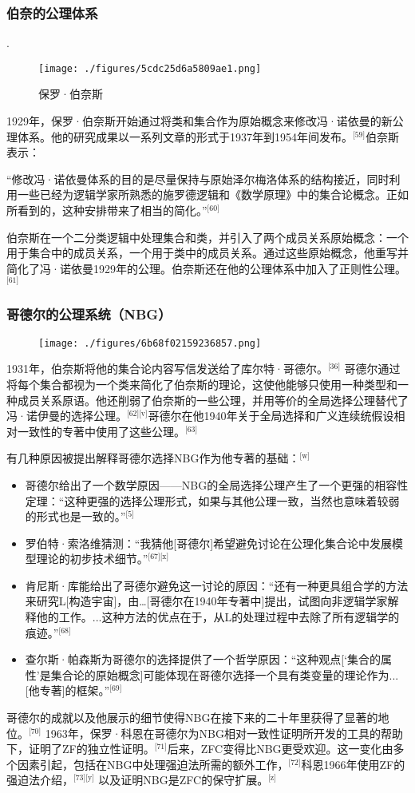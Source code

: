 \subsubsection{伯奈的公理体系}
.\begin{figure}[ht]
\centering
\texttt{[image: ./figures/5cdc25d6a5809ae1.png]}
\caption{保罗·伯奈斯} \label{fig_NBG_3}
\end{figure}
1929年，保罗·伯奈斯开始通过将类和集合作为原始概念来修改冯·诺依曼的新公理体系。他的研究成果以一系列文章的形式于1937年到1954年间发布。\(^\text{[59]}\)伯奈斯表示：

“修改冯·诺依曼体系的目的是尽量保持与原始泽尔梅洛体系的结构接近，同时利用一些已经为逻辑学家所熟悉的施罗德逻辑和《数学原理》中的集合论概念。正如所看到的，这种安排带来了相当的简化。”\(^\text{[60]}\)

伯奈斯在一个二分类逻辑中处理集合和类，并引入了两个成员关系原始概念：一个用于集合中的成员关系，一个用于类中的成员关系。通过这些原始概念，他重写并简化了冯·诺依曼1929年的公理。伯奈斯还在他的公理体系中加入了正则性公理。\(^\text{[61]}\)
\subsubsection{哥德尔的公理系统（NBG）}
\begin{figure}[ht]
\centering
\texttt{[image: ./figures/6b68f02159236857.png]}
\caption{} \label{fig_NBG_4}
\end{figure}
1931年，伯奈斯将他的集合论内容写信发送给了库尔特·哥德尔。\(^\text{[36]}\) 哥德尔通过将每个集合都视为一个类来简化了伯奈斯的理论，这使他能够只使用一种类型和一种成员关系原语。他还削弱了伯奈斯的一些公理，并用等价的全局选择公理替代了冯·诺伊曼的选择公理。\(^\text{[62][v]}\)哥德尔在他1940年关于全局选择和广义连续统假设相对一致性的专著中使用了这些公理。\(^\text{[63]}\)

有几种原因被提出解释哥德尔选择NBG作为他专著的基础：\(^\text{[w]}\)
\begin{itemize}
\item 哥德尔给出了一个数学原因——NBG的全局选择公理产生了一个更强的相容性定理：“这种更强的选择公理形式，如果与其他公理一致，当然也意味着较弱的形式也是一致的。”\(^\text{[5]}\)
\item 罗伯特·索洛维猜测：“我猜他[哥德尔]希望避免讨论在公理化集合论中发展模型理论的初步技术细节。”\(^\text{[67][x]}\)
\item 肯尼斯·库能给出了哥德尔避免这一讨论的原因：“还有一种更具组合学的方法来研究L[构造宇宙]，由…[哥德尔在1940年专著中]提出，试图向非逻辑学家解释他的工作。...这种方法的优点在于，从L的处理过程中去除了所有逻辑学的痕迹。”\(^\text{[68]}\)
\item 查尔斯·帕森斯为哥德尔的选择提供了一个哲学原因：“这种观点[‘集合的属性’是集合论的原始概念]可能体现在哥德尔选择一个具有类变量的理论作为... [他专著]的框架。”\(^\text{[69]}\)
\end{itemize}
哥德尔的成就以及他展示的细节使得NBG在接下来的二十年里获得了显著的地位。\(^\text{[70]}\) 1963年，保罗·科恩在哥德尔为NBG相对一致性证明所开发的工具的帮助下，证明了ZF的独立性证明。\(^\text{[71]}\)后来，ZFC变得比NBG更受欢迎。这一变化由多个因素引起，包括在NBG中处理强迫法所需的额外工作，\(^\text{[72]}\)科恩1966年使用ZF的强迫法介绍，\(^\text{[73][y]}\) 以及证明NBG是ZFC的保守扩展。\(^\text{[z]}\)
